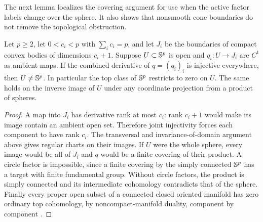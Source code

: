 The next lemma localizes the covering argument for use when the active
factor labels change over the sphere. It also shows that nonsmooth cone
boundaries do not remove the topological obstruction.
\begin{lemma}\label{lem:proper-base-domain}
Let $p\geq2$, let $0<c_i<p$ with $\sum_i c_i=p$, and let $J_i$ be the
boundaries of compact convex bodies of dimensions $c_i+1$. Suppose
$U\subset\mathbb S^p$ is open and $q_i:U\to J_i$ are $C^1$ as ambient maps.
If the combined derivative of $q=(q_i)_i$ is injective everywhere,
then $U\ne\mathbb S^p$. In particular the top class of $\mathbb S^p$ restricts
to zero on $U$. The same holds on the inverse image of $U$ under any
coordinate projection from a product of spheres.
\end{lemma}
\begin{proof}
A map into $J_i$ has derivative rank at most $c_i$: rank $c_i+1$
would make its image contain an ambient open set. Therefore joint
injectivity forces each component to have rank $c_i$. The transversal
and invariance-of-domain argument above gives regular charts on their
images. If $U$ were the whole sphere, every image would be all of $J_i$
and $q$ would be a finite covering of their product. A circle factor is
impossible, since a finite covering by the simply connected $\mathbb S^p$ has
a target with finite fundamental group. Without circle factors, the product is simply connected and its intermediate
cohomology contradicts that of the sphere. Finally every proper open
subset of a connected closed oriented manifold has zero ordinary top
cohomology, by noncompact-manifold duality, component by component
\cite[Section~3.3]{Hatcher2002}.
\end{proof}
